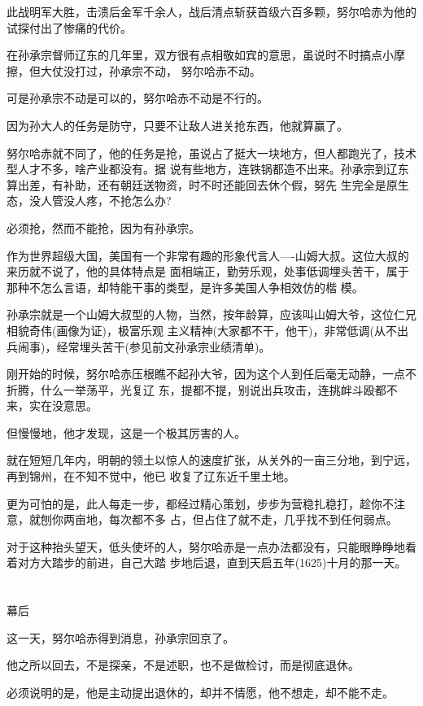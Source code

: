 \documentclass[11pt,a4paper,onecolumn]{article}
\begin{document}
此战明军大胜，击溃后金军千余人，战后清点斩获首级六百多颗，努尔哈赤为他的试探付出了惨痛的代价。

在孙承宗督师辽东的几年里，双方很有点相敬如宾的意思，虽说时不时搞点小摩擦，但大仗没打过，孙承宗不动，
努尔哈赤不动。

可是孙承宗不动是可以的，努尔哈赤不动是不行的。

因为孙大人的任务是防守，只要不让敌人进关抢东西，他就算赢了。

努尔哈赤就不同了，他的任务是抢，虽说占了挺大一块地方，但人都跑光了，技术型人才不多，啥产业都没有。据
说有些地方，连铁锅都造不出来。孙承宗到辽东算出差，有补助，还有朝廷送物资，时不时还能回去休个假，努先
生完全是原生态，没人管没人疼，不抢怎么办?

必须抢，然而不能抢，因为有孙承宗。

作为世界超级大国，美国有一个非常有趣的形象代言人----山姆大叔。这位大叔的来历就不说了，他的具体特点是
面相端正，勤劳乐观，处事低调埋头苦干，属于那种不怎么言语，却特能干事的类型，是许多美国人争相效仿的楷
模。

孙承宗就是一个山姆大叔型的人物，当然，按年龄算，应该叫山姆大爷，这位仁兄相貌奇伟(画像为证)，极富乐观
主义精神(大家都不干，他干)，非常低调(从不出兵闹事)，经常埋头苦干(参见前文孙承宗业绩清单)。

刚开始的时候，努尔哈赤压根瞧不起孙大爷，因为这个人到任后毫无动静，一点不折腾，什么一举荡平，光复辽
东，提都不提，别说出兵攻击，连挑衅斗殴都不来，实在没意思。

但慢慢地，他才发现，这是一个极其厉害的人。

就在短短几年内，明朝的领土以惊人的速度扩张，从关外的一亩三分地，到宁远，再到锦州，在不知不觉中，他已
收复了辽东近千里土地。

更为可怕的是，此人每走一步，都经过精心策划，步步为营稳扎稳打，趁你不注意，就刨你两亩地，每次都不多
占，但占住了就不走，几乎找不到任何弱点。

对于这种抬头望天，低头使坏的人，努尔哈赤是一点办法都没有，只能眼睁睁地看着对方大踏步的前进，自己大踏
步地后退，直到天启五年(1625)十月的那一天。

\section[\thesection]{}

幕后

这一天，努尔哈赤得到消息，孙承宗回京了。

他之所以回去，不是探亲，不是述职，也不是做检讨，而是彻底退休。

必须说明的是，他是主动提出退休的，却并不情愿，他不想走，却不能不走。
\end{document}
